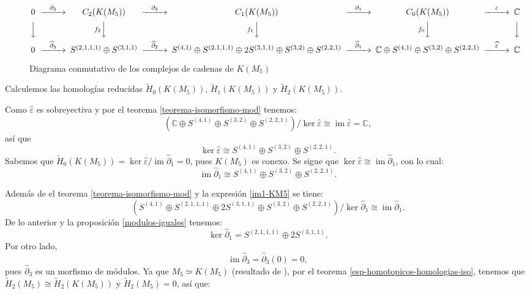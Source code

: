 \documentclass[12pt]{book}
\theoremstyle{definition}
\DeclareMathOperator{\im}{im}
\newcounter{in}
\begin{document}
\begin{sidewaysfigure}%
  {\small
  \[
  \begin{CD}
    0 @>{\partial_{3}}>> C_{2}(K(M_{5})) @>{\partial_{2}}>> C_{1}(K(M_{5})) @>{\partial_{1}}>> C_{0}(K(M_{5})) @>{\varepsilon}>> \mathbb{C}\\
    @VVV   @Vf_{2}VV   @Vf_{1}VV  @Vf_{0}VV  @VVV    \\
    0 @>{\widehat\partial_{3}}>> S^{(2,1,1,1)}\oplus S^{(3,1,1)}
    @>{\widehat\partial_{2}}>> S^{(4,1)}\oplus S^{(2,1,1,1)}\oplus
    2S^{(3,1,1)}\oplus S^{(3,2)} \oplus S^{(2,2,1)}
    @>{\widehat\partial_{1}}>> \mathbb{C}\oplus S^{(4,1)}\oplus
    S^{(3,2)}\oplus S^{(2,2,1)}@>{\widehat \varepsilon}>> \mathbb{C}
  \end{CD}
  \]
   }
  
  \caption{Diagrama conmutativo de los complejos de cadenas de $K(M_{5})$}
  \label{fig:diagrama-conmutativo-clanes5}
\end{sidewaysfigure}

Calculemos las homologías reducidas $\widetilde H_{0}(K(M_{5}))$,
$\widetilde H_{1}(K(M_{5}))$ y $\widetilde H_{2}(K(M_{5}))$.

Como $\widehat\varepsilon$ es sobreyectiva y por el teorema \ref{teorema-isomorfismo-mod} tenemos:
\begin{equation*}
  (\mathbb{C}\oplus S^{(4,1)}\oplus S^{(3,2)}\oplus
  S^{(2,2,1)})/\ker\widehat\varepsilon\cong \im \widehat\varepsilon=\mathbb{C},
\end{equation*}
así que
\begin{equation*}
  \label{ker0-KM5}
  \ker\widehat\varepsilon\cong S^{(4,1)} \oplus S^{(3,2)}\oplus S^{(2,2,1)}.
\end{equation*}
Sabemos que $\widetilde H_{0}(K(M_{5}))=\ker \widehat\varepsilon/\im
\widehat\partial_{1}=0$, pues $K(M_{5})$ es conexo. Se sigue que $\ker \widehat\varepsilon\cong
\im\widehat\partial_{1}$, con lo cual:
\begin{equation}
  \label{im1-KM5}
  \im \widehat\partial_{1}\cong S^{(4,1)} \oplus S^{(3,2)}\oplus S^{(2,2,1)}.
\end{equation}

Además de el teorema \ref{teorema-isomorfismo-mod} y la expresión \ref{im1-KM5} se tiene:
$$(S^{(4,1)}\oplus S^{(2,1,1,1)}\oplus 2S^{(3,1,1)}\oplus S^{(3,2)}
\oplus S^{(2,2,1)})/\ker \widehat\partial_{1}\cong \im \widehat\partial_{1}.$$
De lo anterior y la proposición \ref{modulos-iguales} tenemos:
\begin{equation}
  \label{ker1-KM5}
  \ker \widehat\partial_{1}=S^{(2,1,1,1)}\oplus 2S^{(3,1,1)}.
\end{equation}
Por otro lado,
\begin{equation*}
  \im\widehat\partial_{3}=\widehat\partial_{3}(0)=0,
  \label{im3-KM5}
\end{equation*}
pues $\widehat\partial_{3}$ es un morfismo de módulos. Ya que
$M_{5}\simeq K(M_{5})$ (resultado de \cite{larrion2009clique}), por el teorema
\ref{esp-homotopicos-homologias-iso}, tenemos que $\widetilde
H_{2}(M_{5})\cong\widetilde H_{2}(K(M_{5}))$ y  $\widetilde H_{2}(M_{5})=0$, así que:
\end{document}
